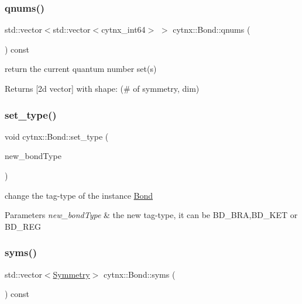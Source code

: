 \subsubsection{\texorpdfstring{qnums()}{qnums()}}
{\footnotesize\ttfamily std\+::vector$<$std\+::vector$<$cytnx\+\_\+int64$>$ $>$ cytnx\+::\+Bond\+::qnums (\begin{DoxyParamCaption}{ }\end{DoxyParamCaption}) const\hspace{0.3cm}{\ttfamily [inline]}}



return the current quantum number set(s) 

\begin{DoxyReturn}{Returns}
\mbox{[}2d vector\mbox{]} with shape\+: (\# of symmetry, dim) 
\end{DoxyReturn}
\mbox{\label{classcytnx_1_1Bond_ae6957c3902bf12fd27ab881db3fe5243}} 
\subsubsection{\texorpdfstring{set\+\_\+type()}{set\_type()}}
{\footnotesize\ttfamily void cytnx\+::\+Bond\+::set\+\_\+type (\begin{DoxyParamCaption}\item[{const bond\+Type \&}]{new\+\_\+bond\+Type }\end{DoxyParamCaption})\hspace{0.3cm}{\ttfamily [inline]}}



change the tag-\/type of the instance \hyperlink{classcytnx_1_1Bond}{Bond} 


\begin{DoxyParams}{Parameters}
{\em new\+\_\+bond\+Type} & the new tag-\/type, it can be B\+D\+\_\+\+B\+RA,B\+D\+\_\+\+K\+ET or B\+D\+\_\+\+R\+EG \\
\hline
\end{DoxyParams}
\mbox{\label{classcytnx_1_1Bond_ad0adf7b134654f0390e98695ba4d416e}} 
\subsubsection{\texorpdfstring{syms()}{syms()}}
{\footnotesize\ttfamily std\+::vector$<$\hyperlink{classcytnx_1_1Symmetry}{Symmetry}$>$ cytnx\+::\+Bond\+::syms (\begin{DoxyParamCaption}{ }\end{DoxyParamCaption}) const\hspace{0.3cm}{\ttfamily [inline]}}



